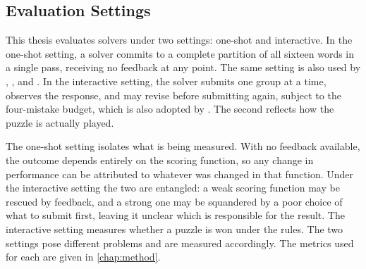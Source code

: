 \subsection{Evaluation Settings}
This thesis evaluates solvers under two settings: one-shot and interactive. In the one-shot setting, a solver commits to a complete partition of all sixteen words in a single pass, receiving no feedback at any point. The same setting is also used by \citeauthor{toddMissedConnectionsLateral2024} \cite{toddMissedConnectionsLateral2024}, \citeauthor{samadarshiConnectingDotsEvaluating2024} \cite{samadarshiConnectingDotsEvaluating2024}, and \citeauthor{loredolopezNYTConnectionsDeceptivelySimple2025} \cite{loredolopezNYTConnectionsDeceptivelySimple2025}. In the interactive setting, the solver submits one group at a time, observes the response, and may revise before submitting again, subject to the four-mistake budget, which is also adopted by \citeauthor{loredolopezNYTConnectionsDeceptivelySimple2025} \cite{loredolopezNYTConnectionsDeceptivelySimple2025}. The second reflects how the puzzle is actually played.

The one-shot setting isolates what is being measured. With no feedback available, the outcome depends entirely on the scoring function, so any change in performance can be attributed to whatever was changed in that function. Under the interactive setting the two are entangled: a weak scoring function may be rescued by feedback, and a strong one may be squandered by a poor choice of what to submit first, leaving it unclear which is responsible for the result. The interactive setting measures whether a puzzle is won under the rules. The two settings pose different problems and are measured accordingly. The metrics used for each are given in \autoref{chap:method}.



